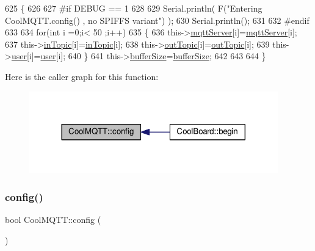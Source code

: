 \begin{DoxyCode}
625 \{
626 
627 \textcolor{preprocessor}{#if DEBUG == 1}
628 
629     Serial.println( F(\textcolor{stringliteral}{"Entering CoolMQTT.config() , no SPIFFS variant"}) );
630     Serial.println();
631 
632 \textcolor{preprocessor}{#endif}
633 
634     \textcolor{keywordflow}{for}(\textcolor{keywordtype}{int} i =0;i< 50 ;i++)
635     \{
636         this->\hyperlink{class_cool_m_q_t_t_ab8bb951f87ddbf92db74c2ad16a3e53e}{mqttServer}[i]=\hyperlink{class_cool_m_q_t_t_ab8bb951f87ddbf92db74c2ad16a3e53e}{mqttServer}[i];
637         this->\hyperlink{class_cool_m_q_t_t_a4492f52a441e83cc5151010317fdb52d}{inTopic}[i]=\hyperlink{class_cool_m_q_t_t_a4492f52a441e83cc5151010317fdb52d}{inTopic}[i];
638         this->\hyperlink{class_cool_m_q_t_t_a109c786a17b463f9eeba046194279522}{outTopic}[i]=\hyperlink{class_cool_m_q_t_t_a109c786a17b463f9eeba046194279522}{outTopic}[i];
639         this->\hyperlink{class_cool_m_q_t_t_a8cd47e45d457f908d4b4390b35aaee83}{user}[i]=\hyperlink{class_cool_m_q_t_t_a8cd47e45d457f908d4b4390b35aaee83}{user}[i];
640     \}
641     this->\hyperlink{class_cool_m_q_t_t_a7f3cf26b51d6770f216e42c5ef13ca9f}{bufferSize}=\hyperlink{class_cool_m_q_t_t_a7f3cf26b51d6770f216e42c5ef13ca9f}{bufferSize};
642     
643 
644 \}
\end{DoxyCode}
Here is the caller graph for this function\+:\nopagebreak
\begin{figure}[H]
\begin{center}
\leavevmode
\includegraphics[width=305pt]{d0/dd0/class_cool_m_q_t_t_a9b703de4f1358f0ee7a5e8c44979c648_icgraph}
\end{center}
\end{figure}
\mbox{\label{class_cool_m_q_t_t_a6571671781a505feca9a8a56e256c6bc}} 
\subsubsection{\texorpdfstring{config()}{config()}\hspace{0.1cm}{\footnotesize\ttfamily [2/2]}}
{\footnotesize\ttfamily bool Cool\+M\+Q\+T\+T\+::config (\begin{DoxyParamCaption}{ }\end{DoxyParamCaption})}

